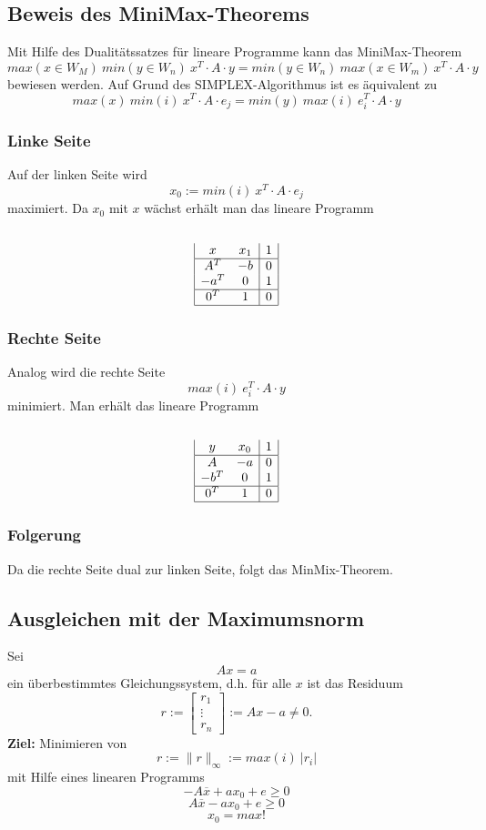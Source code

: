 \subsection{Beweis des MiniMax-Theorems}
Mit Hilfe des Dualitätssatzes für lineare Programme kann das MiniMax-Theorem
\[max(x \in W_M)~min(y \in W_n)~x^T\cdot A\cdot y = min(y \in W_n)~max(x \in W_m)~x^T\cdot A \cdot y\]
bewiesen werden. Auf Grund des SIMPLEX-Algorithmus ist es äquivalent zu
\[max(x)~min(i)~x^T\cdot A \cdot e_j = min(y)~max(i)~e_i^T\cdot A \cdot y\]

\subsubsection{Linke Seite}
Auf der linken Seite wird
\[x_0 := min(i)~x^T\cdot A \cdot e_j\]
maximiert. Da \(x_0\) mit \(x\) wächst erhält man das lineare Programm
\\\\
\[\begin{array}{|cc|c|}
x & x_1 & 1 \\
\hline
A^T & -b & 0 \\
-a^T & 0 & 1 \\
\hline
0^T & 1 & 0 \\
\hline
\end{array}\]

\subsubsection{Rechte Seite}
Analog wird die rechte Seite
\[max(i)~e_i^T\cdot A \cdot y\]
minimiert. Man erhält das lineare Programm
\\\\
\[\begin{array}{|cc|c|}
y & x_0 & 1 \\
\hline
A & -a & 0 \\
-b^T & 0 & 1 \\
\hline
0^T & 1 & 0 \\
\hline
\end{array}\]

\subsubsection{Folgerung}
Da die rechte Seite dual zur linken Seite, folgt das MinMix-Theorem.


\subsection{Ausgleichen mit der Maximumsnorm}
Sei
\[Ax = a\]
ein überbestimmtes Gleichungssystem, d.h. für alle \(x\) ist das Residuum
\[r := \begin{bmatrix} r_1 \\ \vdots \\ r_n \end{bmatrix} := Ax - a \ne 0.\]
\textbf{Ziel:} Minimieren von
\[r := \parallel r \parallel_{\infty} := max(i)~|r_i|\]
mit Hilfe eines linearen Programms
\[-A\overline{x} + ax_0 + e \geq 0\]
\[A\overline{x} - ax_0 + e \geq 0\]
\[x_0 = max!\]

